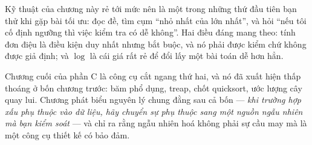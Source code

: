 \documentclass[../../algorithm.tex]{subfiles}
\begin{document}
Kỹ thuật của chương này rẻ tới mức nên là một trong những thứ đầu tiên bạn thử khi gặp bài tối ưu: đọc đề, tìm cụm ``nhỏ nhất của lớn nhất'', và hỏi ``nếu tôi cố định ngưỡng thì việc kiểm tra có dễ không''. Hai điều đáng mang theo: tính đơn điệu là điều kiện duy nhất nhưng bắt buộc, và nó phải được kiểm chứ không được giả định; và \(\log\) là cái giá rất rẻ để đổi lấy một bài toán dễ hơn hẳn.

Chương cuối của phần C là công cụ cắt ngang thứ hai, và nó đã xuất hiện thấp thoáng ở bốn chương trước: băm phổ dụng, treap, chốt quicksort, ước lượng cây quay lui. Chương  phát biểu nguyên lý chung đằng sau cả bốn --- \emph{khi trường hợp xấu phụ thuộc vào dữ liệu, hãy chuyển sự phụ thuộc sang một nguồn ngẫu nhiên mà bạn kiểm soát} --- và chỉ ra rằng ngẫu nhiên hoá không phải sự cầu may mà là một công cụ thiết kế có bảo đảm.
\ifSubfilesClassLoaded{\printbibliography[title={Nguồn}]}{}
\end{document}
